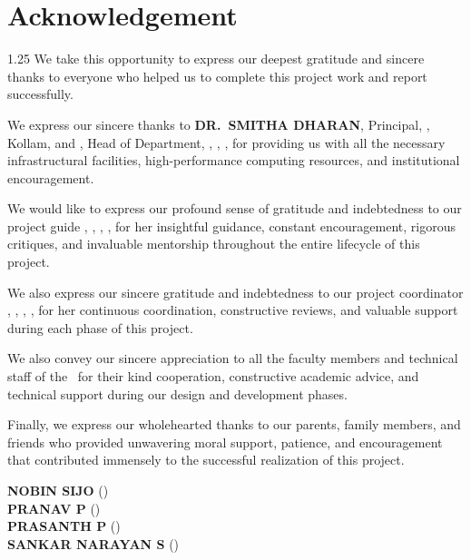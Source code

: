 \chapter*{Acknowledgement}%
%
\vspace{-15pt}

\begin{spacing}{1.25}
\noindent We take this opportunity to express our deepest gratitude and sincere thanks to everyone who helped us to complete this project work and report successfully.

\vspace{6pt}

\noindent We express our sincere thanks to \textbf{\MakeUppercase{Dr.~Smitha Dharan}}, Principal, \college, Kollam, and \textbf{\MakeUppercase{\hod}}, Head of Department, \dept, \college, \collegeplace, for providing us with all the necessary infrastructural facilities, high-performance computing resources, and institutional encouragement.

\vspace{6pt}

\noindent We would like to express our profound sense of gratitude and indebtedness to our project guide \mbox{\textbf{\MakeUppercase{\guide}}}, \guidedes, \dept, \college, for her insightful guidance, constant encouragement, rigorous critiques, and invaluable mentorship throughout the entire lifecycle of this project.

\vspace{6pt}

\noindent We also express our sincere gratitude and indebtedness to our project coordinator \mbox{\textbf{\MakeUppercase{\coordinator}}}, \coordinatordes, \dept, \college, for her continuous coordination, constructive reviews, and valuable support during each phase of this project.

\vspace{6pt}

\noindent We also convey our sincere appreciation to all the faculty members and technical staff of the \dept\ for their kind cooperation, constructive academic advice, and technical support during our design and development phases.

\vspace{6pt}

\noindent Finally, we express our wholehearted thanks to our parents, family members, and friends who provided unwavering moral support, patience, and encouragement that contributed immensely to the successful realization of this project.

\vspace*{14pt}
\begin{flushright}
	\textbf{NOBIN SIJO} (\rollnoA) \\[3pt]
	\textbf{PRANAV P} (\rollnoB) \\[3pt]
	\textbf{PRASANTH P} (\rollnoC) \\[3pt]
	\textbf{SANKAR NARAYAN S} (\rollnoD)
\end{flushright}
\end{spacing}

\thispagestyle{plain}
